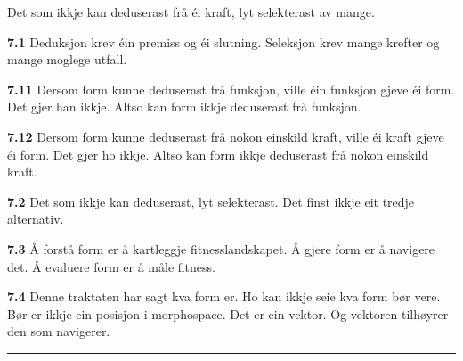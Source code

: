 \documentclass[11pt, a4paper]{article}
\newcommand{\prop}[1]{\bigskip\noindent{\Large\textbf{\textcolor{propcolor}{#1}}}\quad}
\newcommand{\subprop}[1]{\medskip\noindent\textbf{#1}\quad}
\begin{document}
\prop{7} Det som ikkje kan deduserast fr\aa{} \'ei kraft, lyt selekterast av mange.

\subprop{7.1} Deduksjon krev \'ein premiss og \'ei slutning. Seleksjon krev mange krefter og mange moglege utfall.

\subprop{7.11} Dersom form kunne deduserast fr\aa{} funksjon, ville \'ein funksjon gjeve \'ei form. Det gjer han ikkje. Altso kan form ikkje deduserast fr\aa{} funksjon.

\subprop{7.12} Dersom form kunne deduserast fr\aa{} nokon einskild kraft, ville \'ei kraft gjeve \'ei form. Det gjer ho ikkje. Altso kan form ikkje deduserast fr\aa{} nokon einskild kraft.

\subprop{7.2} Det som ikkje kan deduserast, lyt selekterast. Det finst ikkje eit tredje alternativ.

\subprop{7.3} \AA{} forst\aa{} form er \aa{} kartleggje fitnesslandskapet. \AA{} gjere form er \aa{} navigere det. \AA{} evaluere form er \aa{} m\aa le fitness.

\subprop{7.4} Denne traktaten har sagt kva form er. Ho kan ikkje seie kva form b\o r vere. B\o r er ikkje ein posisjon i morphospace. Det er ein vektor. Og vektoren tilh\o yrer den som navigerer.

\vspace{3em}

\begin{center}
\rule{0.4\textwidth}{0.4pt}
\end{center}
\end{document}
